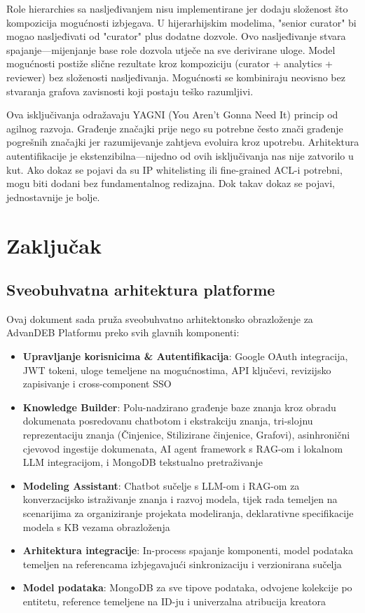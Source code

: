 \documentclass[12pt,a4paper]{article}
\begin{document}
Role hierarchies sa nasljeđivanjem nisu implementirane jer dodaju složenost što kompozicija mogućnosti izbjegava. U hijerarhijskim modelima, "senior curator" bi mogao nasljeđivati od "curator" plus dodatne dozvole. Ovo nasljeđivanje stvara spajanje—mijenjanje base role dozvola utječe na sve derivirane uloge. Model mogućnosti postiže slične rezultate kroz kompoziciju (curator + analytics + reviewer) bez složenosti nasljeđivanja. Mogućnosti se kombiniraju neovisno bez stvaranja grafova zavisnosti koji postaju teško razumljivi.

Ova isključivanja odražavaju YAGNI (You Aren't Gonna Need It) princip od agilnog razvoja. Građenje značajki prije nego su potrebne često znači građenje pogrešnih značajki jer razumijevanje zahtjeva evoluira kroz upotrebu. Arhitektura autentifikacije je ekstenzibilna—nijedno od ovih isključivanja nas nije zatvorilo u kut. Ako dokaz se pojavi da su IP whitelisting ili fine-grained ACL-i potrebni, mogu biti dodani bez fundamentalnog redizajna. Dok takav dokaz se pojavi, jednostavnije je bolje.

\section{Zaključak}

\subsection{Sveobuhvatna arhitektura platforme}

Ovaj dokument sada pruža sveobuhvatno arhitektonsko obrazloženje za AdvanDEB Platformu preko svih glavnih komponenti:

\begin{itemize}[leftmargin=*]
    \item \textbf{Upravljanje korisnicima \& Autentifikacija}: Google OAuth integracija, JWT tokeni, uloge temeljene na mogućnostima, API ključevi, revizijsko zapisivanje i cross-component SSO
    \item \textbf{Knowledge Builder}: Polu-nadzirano građenje baze znanja kroz obradu dokumenata posredovanu chatbotom i ekstrakciju znanja, tri-slojnu reprezentaciju znanja (Činjenice, Stilizirane činjenice, Grafovi), asinhronični cjevovod ingestije dokumenata, AI agent framework s RAG-om i lokalnom LLM integracijom, i MongoDB tekstualno pretraživanje
    \item \textbf{Modeling Assistant}: Chatbot sučelje s LLM-om i RAG-om za konverzacijsko istraživanje znanja i razvoj modela, tijek rada temeljen na scenarijima za organiziranje projekata modeliranja, deklarativne specifikacije modela s KB vezama obrazloženja
    \item \textbf{Arhitektura integracije}: In-process spajanje komponenti, model podataka temeljen na referencama izbjegavajući sinkronizaciju i verzionirana sučelja
    \item \textbf{Model podataka}: MongoDB za sve tipove podataka, odvojene kolekcije po entitetu, reference temeljene na ID-ju i univerzalna atribucija kreatora
\end{itemize}
\end{document}
